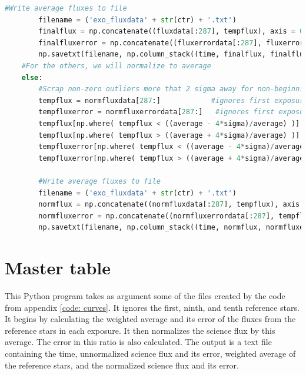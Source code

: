 \documentclass{aastex61}
\begin{document}
\begin{lstlisting}[language = Python, caption = Plots the lightcurves for each star and outputs fluxes to files (YM and JM)]
		#Write average fluxes to file
		filename = ('exo_fluxdata' + str(ctr) + '.txt')
		finalflux = np.concatenate((fluxdata[:287], tempflux), axis = 0) #flux with beginning
		finalfluxerror = np.concatenate((fluxerrordata[:287], fluxerror), axis=0)        
		np.savetxt(filename, np.column_stack((time, finalflux, finalfluxerror)), fmt='%f') 
	#For the others, we will normalize to average
	else:
		#Scrap non-zero outliers more that 2 sigma away for non-beginning exposures
		tempflux = normfluxdata[287:]            #ignores first exposures
		tempfluxerror = normfluxerrordata[287:]   #ignores first exposures
		tempflux[np.where( tempflux < ((average - 4*sigma)/average) )] = 0.0
		tempflux[np.where( tempflux > ((average + 4*sigma)/average) )] = 0.0
		tempfluxerror[np.where( tempflux < ((average - 4*sigma)/average) )] = 0.0
		tempfluxerror[np.where( tempflux > ((average + 4*sigma)/average) )] = 0.0
		
		#Write average fluxes to file
		filename = ('exo_fluxdata' + str(ctr) + '.txt')
		normflux = np.concatenate((normfluxdata[:287], tempflux), axis = 0)
		normfluxerror = np.concatenate((normfluxerrordata[:287], tempfluxerror), axis = 0)
		np.savetxt(filename, np.column_stack((time, normflux, normfluxerror)), fmt='%f')
\end{lstlisting}

\section{Master table} \label{code: bigtable}
This Python program takes as argument some of the files created by the code from appendix \ref{code: curves}. It ignores the first, ninth, and tenth reference stars. It begins by calculating the weighted average and its error of the fluxes from the reference stars in each exposure. It then normalizes the science flux by this average. The error in this ratio is also calculated. The output is a text file containing the time, unnormalized science flux and its error, weighted average of the reference stars, and the normalized science flux and its error. 
\end{document}
